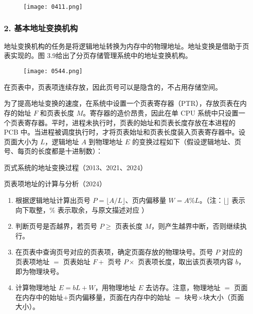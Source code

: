 \documentclass{ctexbook}
\begin{document}
	\begin{figure}[h]
		\centering
		\texttt{[image: 0411.png]}
		\label{fig:tttttttttt}
	\end{figure}
	
	\subsubsection{2. 基本地址变换机构}
	地址变换机构的任务是将逻辑地址转换为内存中的物理地址。地址变换是借助于页表实现的。图 3.9给出了分页存储管理系统中的地址变换机构。
	
	\begin{figure}[h]
		\centering
		\texttt{[image: 0544.png]}
		\label{fig:ttttttttttt}
	\end{figure}
	
	\begin{tcolorbox}[colback=gray!20, colframe=gray!50, title={注 意}]
		在页表中，页表项连续存放，因此页号可以是隐含的，不占用存储空间。
	\end{tcolorbox}
	
	为了提高地址变换的速度，在系统中设置一个页表寄存器（PTR），存放页表在内存的始址 \( F \) 和页表长度 \( M \)。寄存器的造价昂贵，因此在单 CPU 系统中只设置一个页表寄存器。平时，进程未执行时，页表的始址和页表长度存放在本进程的 PCB 中。当进程被调度执行时，才将页表始址和页表长度装入页表寄存器中。设页面大小为 \( L \)，逻辑地址 \( A \) 到物理地址 \( E \) 的变换过程如下（假设逻辑地址、页号、每页的长度都是十进制数）：
	
	\begin{tcolorbox}[colback=gray!10, colframe=gray!30, title={命题追踪}]
		页式系统的地址变换过程（2013、2021、2024）
	\end{tcolorbox}
	
	\begin{tcolorbox}[colback=gray!10, colframe=gray!30, title={命题追踪}]
		页表项地址的计算与分析（2024）
	\end{tcolorbox}
	
	\begin{enumerate}
		\item 根据逻辑地址计算出页号 \( P = \lfloor A / L \rfloor \)、页内偏移量 \( W = A \% L \)。（注：\(\lfloor  \rfloor\) 表示向下取整，\(\%\) 表示取余，与原文描述对应 ）
		\item 判断页号是否越界，若页号 \( P \geq \) 页表长度 \( M \)，则产生越界中断，否则继续执行。
		\item 在页表中查询页号对应的页表项，确定页面存放的物理块号。页号 \( P \) 对应的页表项地址 \( = \) 页表始址 \( F + \) 页号 \( P \times \) 页表项长度，取出该页表项内容 \( b \)，即为物理块号。
		\item 计算物理地址 \( E = bL + W \)，用物理地址 \( E \) 去访存。注意，物理地址 \( = \) 页面在内存中的始址\( + \)页内偏移量，页面在内存中的始址 \( = \) 块号\( \times \)块大小（页面大小）。
	\end{enumerate}
	
\end{document}
